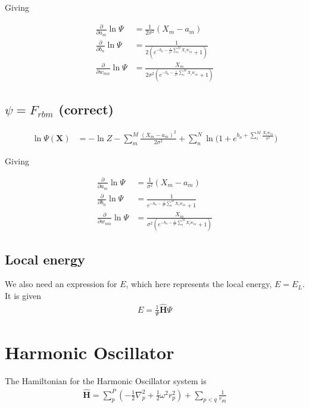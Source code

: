 \documentclass[norsk,a4paper,11pt]{article}
\begin{document}
Giving

\begin{align}
	\frac{\partial }{\partial a_m} \ln\Psi
	&= 	\frac{1}{2\sigma^2} (X_m - a_m) \\
	\frac{\partial }{\partial b_n} \ln\Psi
	&=
	\frac{1}{2(e^{-b_n-\frac{1}{\sigma^2}\sum_i^M X_i w_{in}} + 1)} \\
	\frac{\partial }{\partial w_{mn}} \ln\Psi
	&= \frac{X_m}{2\sigma^2(e^{-b_n-\frac{1}{\sigma^2}\sum_i^M X_i w_{in}} + 1)}
\end{align}

\color{Blue}
\subsection{$\psi = F_{rbm}$ (correct)}
\color{Black}
\begin{align}
	\ln{\Psi({\mathbf{X}})} &= -\ln{Z} - \sum_m^M \frac{(X_m - a_m)^2}{2\sigma^2}
	+ \sum_n^N \ln({1 + e^{b_n + \sum_i^M \frac{X_i w_{in}}{\sigma^2}})}
\end{align}

Giving

\begin{align}
	\frac{\partial }{\partial a_m} \ln\Psi
	&= 	\frac{1}{\sigma^2} (X_m - a_m) \\
	\frac{\partial }{\partial b_n} \ln\Psi
	&=
	\frac{1}{e^{-b_n-\frac{1}{\sigma^2}\sum_i^M X_i w_{in}} + 1} \\
	\frac{\partial }{\partial w_{mn}} \ln\Psi
	&= \frac{X_m}{\sigma^2(e^{-b_n-\frac{1}{\sigma^2}\sum_i^M X_i w_{in}} + 1)}
\end{align}

\subsection{Local energy}
We also need an expression for $E$, which here represents the local energy, $E=E_L$. It is given
\begin{align}
	E = \frac{1}{\Psi} \hat{\mathbf{H}} \Psi
\end{align}

\section{Harmonic Oscillator}
The Hamiltonian for the Harmonic Oscillator system is \cite{lectures2015}
\begin{align}
	\hat{\mathbf{H}} = \sum_p^P (-\frac{1}{2}\nabla_p^2 + \frac{1}{2}\omega^2 r_p^2 ) + \sum_{p<q} \frac{1}{r_{pq}}
\end{align}
\end{document}
